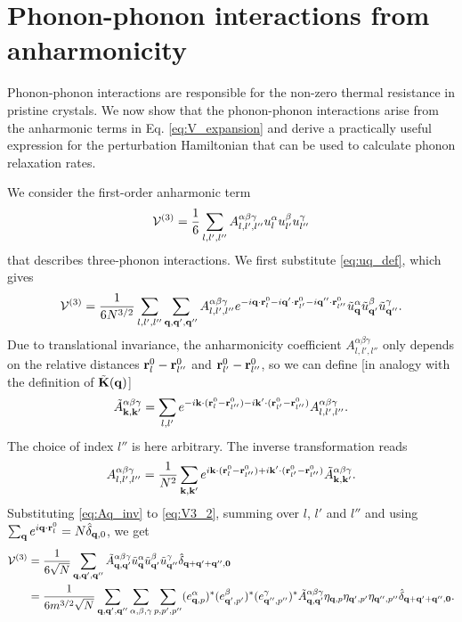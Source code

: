 \section{Phonon-phonon interactions from anharmonicity}

Phonon-phonon interactions are responsible for the non-zero thermal resistance in pristine crystals. We now show that the phonon-phonon interactions arise from the anharmonic terms in Eq. \eqref{eq:V_expansion} and derive a practically useful expression for the perturbation Hamiltonian that can be used to calculate phonon relaxation rates. 

We consider the first-order anharmonic term
\begin{equation}
 \mathcal{V}^{(3)} = \frac{1}{6} \sum_{l,l',l''} A_{l,l',l''}^{\alpha\beta\gamma} u_l^{\alpha} u_{l'}^{\beta} u_{l''}^{\gamma}
\end{equation}
that describes three-phonon interactions. We first substitute \eqref{eq:uq_def}, which gives
\begin{equation}
 \mathcal{V}^{(3)} =\frac{1}{6N^{3/2}} \sum_{l,l',l''}\sum_{\mathbf{q},\mathbf{q}',\mathbf{q}''} A_{l,l',l''}^{\alpha\beta\gamma} e^{-i\mathbf{q}\cdot\mathbf{r}^0_l-i\mathbf{q}'\cdot\mathbf{r}^0_{l'}-i\mathbf{q}''\cdot\mathbf{r}^0_{l''}} \tilde{u}_{\mathbf{q}}^{\alpha} \tilde{u}_{\mathbf{q}'}^{\beta} \tilde{u}_{\mathbf{q}''}^{\gamma} . \label{eq:V3_2}
\end{equation}
Due to translational invariance, the anharmonicity coefficient $A_{l,l',l''}^{\alpha\beta\gamma}$ only depends on the relative distances $\mathbf{r}^0_{l}-\mathbf{r}^0_{l''}$ and $\mathbf{r}^0_{l'}-\mathbf{r}^0_{l''}$, so we can define [in analogy with the definition of $\tilde{\mathbf{K}}(\mathbf{q})$]
\begin{equation}
 \tilde A_{\mathbf{k},\mathbf{k}'}^{\alpha\beta\gamma}= \sum_{l,l'} e^{-i \mathbf{k} \cdot (\mathbf{r}^0_{l}-\mathbf{r}^0_{l''})-i\mathbf{k}'\cdot(\mathbf{r}^0_{l'}-\mathbf{r}^0_{l''}) }  A_{l,l',l''}^{\alpha\beta\gamma}.
\end{equation}
The choice of index $l''$ is here arbitrary. The inverse transformation reads
\begin{equation}
 A_{l,l',l''}^{\alpha\beta\gamma} = \frac{1}{N^2} \sum_{\mathbf{k},\mathbf{k}'} e^{i\mathbf{k} \cdot(\mathbf{r}_l^0-\mathbf{r}^0_{l''}) + i\mathbf{k}' \cdot(\mathbf{r}_{l'}^0-\mathbf{r}^0_{l''})} \tilde A_{\mathbf{k},\mathbf{k}'}^{\alpha\beta\gamma}. \label{eq:Aq_inv}
\end{equation}
Substituting \eqref{eq:Aq_inv} to \eqref{eq:V3_2}, summing over $l$, $l'$ and $l''$ and using $\sum_{\mathbf{q}}e^{i\mathbf{q}\cdot \mathbf{r}^0_{l}}=N \hat\delta_{\mathbf{q},0}$, we get
\begin{alignat}{2}
 \mathcal{V}^{(3)} &=\frac{1}{6\sqrt{N}} \sum_{\mathbf{q},\mathbf{q}',\mathbf{q}''} \tilde A_{\mathbf{q},\mathbf{q}'}^{\alpha\beta\gamma} \tilde u_{\mathbf{q}}^{\alpha} \tilde {u}_{\mathbf{q}'}^{\beta} \tilde  {u}_{\mathbf{q}''}^{\gamma} \hat \delta_{\mathbf{q}+\mathbf{q}'+\mathbf{q}'',\mathbf{0}} \\
 &= \frac{1}{6m^{3/2}\sqrt{N}} \sum_{\mathbf{q},\mathbf{q}',\mathbf{q}''} \sum_{\alpha,\beta,\gamma} \sum_{p,p',p''} (e^{\alpha}_{\mathbf{q},p})^* (e^{\beta}_{\mathbf{q}',p'})^* (e^{\gamma}_{\mathbf{q}'',p''})^* \tilde A_{\mathbf{q},\mathbf{q}'}^{\alpha\beta\gamma} \eta_{\mathbf{q},p} \eta_{\mathbf{q}',p'} \eta_{\mathbf{q}'',p''} \hat \delta_{\mathbf{q}+\mathbf{q}'+\mathbf{q}'',\mathbf{0}}.
\end{alignat}
